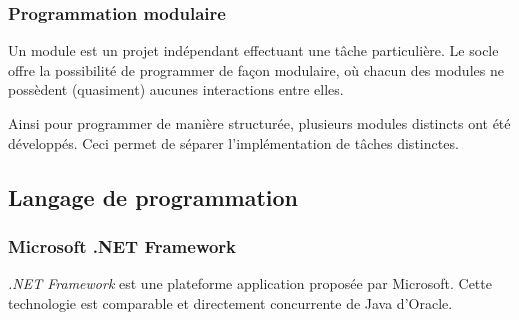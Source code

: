 
\subsubsection{Programmation modulaire}
\label{Programmation modulaire}

Un module est un projet indépendant effectuant une tâche particulière.
Le socle offre la possibilité de programmer de façon modulaire, où chacun des modules ne possèdent (quasiment) aucunes interactions entre elles.

Ainsi pour programmer de manière structurée, plusieurs modules distincts ont été développés.
Ceci permet de séparer l'implémentation de tâches distinctes.


\subsection{Langage de programmation}


\subsubsection{Microsoft .NET Framework}

\textit{.NET Framework} est une plateforme application proposée par Microsoft.
Cette technologie est comparable et directement concurrente de Java d'Oracle.

